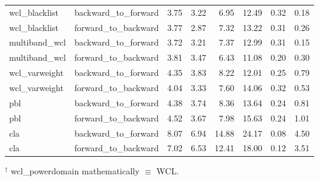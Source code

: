 \begin{tabular}{llrrrrrr}
wcl\_blacklist & backward\_to\_forward & 3.75 & 3.22 & 6.95 & 12.49 & 0.32 & 0.18 \\
wcl\_blacklist & forward\_to\_backward & 3.77 & 2.87 & 7.32 & 13.22 & 0.31 & 0.26 \\
multiband\_wcl & backward\_to\_forward & 3.72 & 3.21 & 7.37 & 12.99 & 0.31 & 0.15 \\
multiband\_wcl & forward\_to\_backward & 3.81 & 3.47 & 6.43 & 11.08 & 0.20 & 0.30 \\
wcl\_varweight & backward\_to\_forward & 4.35 & 3.83 & 8.22 & 12.01 & 0.25 & 0.79 \\
wcl\_varweight & forward\_to\_backward & 4.04 & 3.33 & 7.60 & 14.06 & 0.32 & 0.53 \\
pbl & backward\_to\_forward & 4.38 & 3.74 & 8.36 & 13.64 & 0.24 & 0.81 \\
pbl & forward\_to\_backward & 4.52 & 3.67 & 7.98 & 15.63 & 0.24 & 1.01 \\
cla & backward\_to\_forward & 8.07 & 6.94 & 14.88 & 24.17 & 0.08 & 4.50 \\
cla & forward\_to\_backward & 7.02 & 6.53 & 12.41 & 18.00 & 0.12 & 3.51 \\
\bottomrule
\end{tabular}
\par\footnotesize $^\dagger$ wcl\_powerdomain mathematically $\equiv$ WCL.
